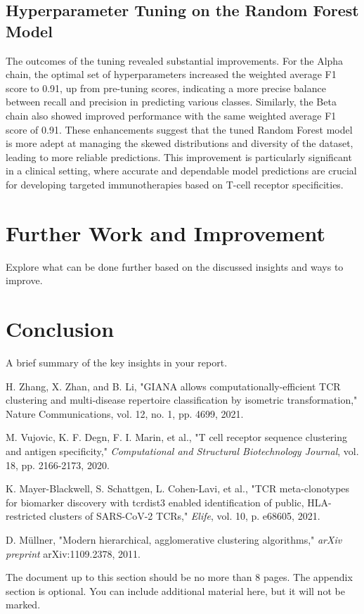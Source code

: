 \documentclass[conference]{IEEEtran}
\begin{document}
    \subsection{Hyperparameter Tuning on the Random Forest Model}

    The outcomes of the tuning revealed substantial improvements. For the Alpha chain, the optimal set of hyperparameters increased the weighted average F1 score to 0.91, up from pre-tuning scores, indicating a more precise balance between recall and precision in predicting various classes. Similarly, the Beta chain also showed improved performance with the same weighted average F1 score of 0.91. These enhancements suggest that the tuned Random Forest model is more adept at managing the skewed distributions and diversity of the dataset, leading to more reliable predictions. This improvement is particularly significant in a clinical setting, where accurate and dependable model predictions are crucial for developing targeted immunotherapies based on T-cell receptor specificities.
	
	\section{Further Work and Improvement}
	{\color{blue}Explore what can be done further based on the discussed insights and ways to improve.}
    
	
	\section{Conclusion}
	{\color{blue}A brief summary of the key insights in your report.}
	
	\begin{thebibliography}{00}
		
		 H. Zhang, X. Zhan, and B. Li, "GIANA allows computationally-efficient TCR clustering and multi-disease repertoire classification by isometric transformation," Nature Communications, vol. 12, no. 1, pp. 4699, 2021.
		
		 M. Vujovic, K. F. Degn, F. I. Marin, et al., "T cell receptor sequence clustering and antigen specificity," \textit{Computational and Structural Biotechnology Journal}, vol. 18, pp. 2166-2173, 2020.
		
		 K. Mayer-Blackwell, S. Schattgen, L. Cohen-Lavi, et al., "TCR meta-clonotypes for biomarker discovery with tcrdist3 enabled identification of public, HLA-restricted clusters of SARS-CoV-2 TCRs," \textit{Elife}, vol. 10, p. e68605, 2021.
		
		 D. Müllner, "Modern hierarchical, agglomerative clustering algorithms,"
		\textit{arXiv preprint} arXiv:1109.2378, 2011.
		
		
	\end{thebibliography}
	
	\appendix
	{\color{blue}The document up to this section should be no more than 8 pages. The appendix section is optional. You can include additional material here, but it will not be marked.}
	
    
\end{document}
